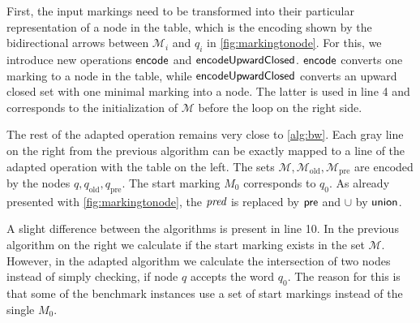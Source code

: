 First, the input markings need to be transformed into their particular representation of a node in the table, which is the encoding shown by the bidirectional arrows between $\mathcal{M}_{i}$ and $q_{i}$ in \autoref{fig:markingtonode}. 
For this, we introduce new operations $\operatorname{\textsf{encode}}$ and $\operatorname{\textsf{encodeUpwardClosed}}$. $\operatorname{\textsf{encode}}$ converts one marking to a node in the table, while $\operatorname{\textsf{encodeUpwardClosed}}$ converts an upward closed set with one minimal marking into a node. The latter is used in line 4 and corresponds to the initialization of $\mathcal{M}$ before the loop on the right side.

\par

The rest of the adapted operation remains very close to \autoref{alg:bw}. Each gray line on the right from the previous algorithm can be exactly mapped to a line of the adapted operation with the table on the left. The sets $\mathcal{M}, \mathcal{M}_{\text{old}}, \mathcal{M}_{\text{pre}}$ are encoded by the nodes $q,q_{\text{old}},q_{\text{pre}}$. The start marking $M_{0}$ corresponds to $q_{0}$. 
As already presented with \autoref{fig:markingtonode}, the $\operatorname{\textit{pred}}$ is replaced by $\operatorname{\textsf{pre}}$ and $\cup$ by $\operatorname{\textsf{union}}$. 



A slight difference between the algorithms is present in line 10. In the previous algorithm on the right we calculate if the start marking exists in the set $\mathcal{M}$. However, in the adapted algorithm we calculate the intersection of two nodes instead of simply checking, if node $q$ accepts the word $q_{0}$. The reason for this is that some of the benchmark instances use a set of start markings instead of the single $M_{0}$.

\par 

